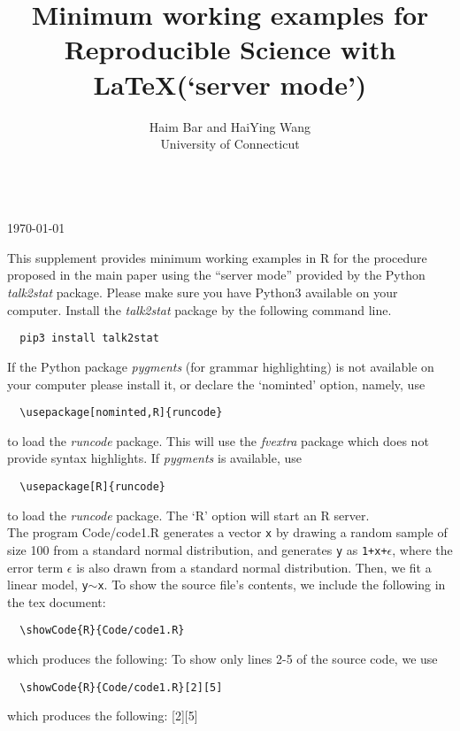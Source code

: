 \documentclass[12pt]{amsart}
\title{Minimum working examples for\\ Reproducible Science with \LaTeX\space (`server mode')}
\begin{document}
\maketitle

\begin{center}
\author{Haim Bar and HaiYing Wang\\ University of Connecticut}\\
\today
\end{center}

This supplement provides minimum working examples in R for the procedure proposed in the main paper using the ``server mode'' provided by the Python \textit{talk2stat} package. Please make sure you have Python3 available on your computer. Install the \textit{talk2stat} package by the following command line.
\begin{verbatim}
  pip3 install talk2stat
\end{verbatim}
If the Python package \textit{pygments} (for grammar highlighting) is not available on your computer please install it,  or declare the `nominted' option, namely, use
\begin{verbatim}
  \usepackage[nominted,R]{runcode}
\end{verbatim}
to load the \textit{runcode} package. This will use the \textit{fvextra} package which does not provide syntax highlights. If \textit{pygments} is available, use
\begin{verbatim}
  \usepackage[R]{runcode}
\end{verbatim}
to load the \textit{runcode} package. The `R' option will start an R server.\\

The program Code/code1.R generates a vector \texttt{x} by drawing a random sample of size 100 from a standard normal distribution, and generates \texttt{y} as \texttt{1+x+$\epsilon$}, where the error term \texttt{$\epsilon$}
is also drawn from a standard normal distribution.
Then, we fit a linear model, \texttt{y$\sim$x}. To show the source file's contents, we include the following in the tex document:
\begin{verbatim}
  \showCode{R}{Code/code1.R}
\end{verbatim}
which produces the following:
To show only lines 2-5 of the source code, we use
\begin{verbatim}
  \showCode{R}{Code/code1.R}[2][5]
\end{verbatim}
which produces the following:
[2][5]
\vspace{2mm}
\end{document}
